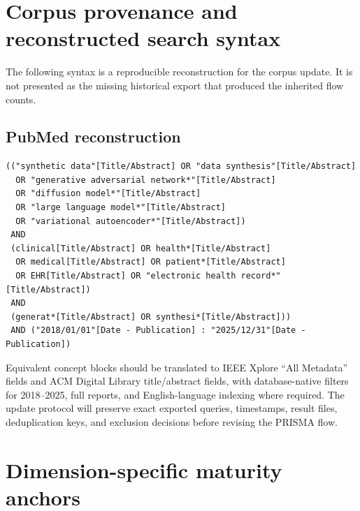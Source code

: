 \documentclass[11pt,letterpaper]{article}
\begin{document}
\clearpage
\appendix

\section{Corpus provenance and reconstructed search syntax}
\label{app:search}

The following syntax is a reproducible reconstruction for the corpus update. It is not presented as the missing historical export that produced the inherited flow counts.

\subsection*{PubMed reconstruction}
\begin{verbatim}
(("synthetic data"[Title/Abstract] OR "data synthesis"[Title/Abstract]
  OR "generative adversarial network*"[Title/Abstract]
  OR "diffusion model*"[Title/Abstract]
  OR "large language model*"[Title/Abstract]
  OR "variational autoencoder*"[Title/Abstract])
 AND
 (clinical[Title/Abstract] OR health*[Title/Abstract]
  OR medical[Title/Abstract] OR patient*[Title/Abstract]
  OR EHR[Title/Abstract] OR "electronic health record*"[Title/Abstract])
 AND
 (generat*[Title/Abstract] OR synthesi*[Title/Abstract]))
 AND ("2018/01/01"[Date - Publication] : "2025/12/31"[Date - Publication])
\end{verbatim}

Equivalent concept blocks should be translated to IEEE Xplore ``All Metadata'' fields and ACM Digital Library title/abstract fields, with database-native filters for 2018--2025, full reports, and English-language indexing where required. The update protocol will preserve exact exported queries, timestamps, result files, deduplication keys, and exclusion decisions before revising the PRISMA flow.

\section{Dimension-specific maturity anchors}
\end{document}
